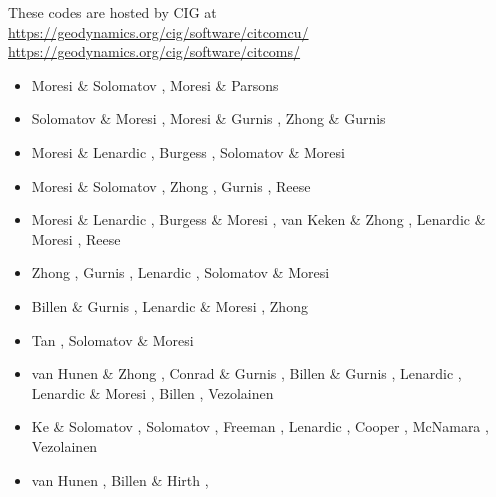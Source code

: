 \begin{itemize}
These codes are hosted by CIG at\\
\url{https://geodynamics.org/cig/software/citcomcu/}  \\
\url{https://geodynamics.org/cig/software/citcoms/}

\begin{scriptsize}
\begin{itemize}
\item[\nineteenninetyfive] Moresi \& Solomatov \cite{moso95}, Moresi \& Parsons \cite{mopa95}
\item[\nineteenninetysix] Solomatov \& Moresi \cite{somo96}, Moresi \& Gurnis \cite{mogu96}, 
                    Zhong \& Gurnis \cite{zhgu96}
\item[\nineteenninetyseven] Moresi \& Lenardic \cite{mole97}, Burgess \etal \cite{bugm97}, 
                    Solomatov \& Moresi \cite{somo97}
\item[\nineteenninetyeight] Moresi \& Solomatov \cite{moso98}, Zhong \etal \cite{zhgm98}, 
                    Gurnis \etal \cite{gumm98}, Reese \etal \cite{resm98}
\item[\nineteenninetynine] Moresi \& Lenardic \cite{mole99}, Burgess \& Moresi \cite{bumo99}, 
                    van Keken \& Zhong \cite{vazh99}, Lenardic \& Moresi \cite{lemo99}, 
                    Reese \etal \cite{resm99}
\item[\twothousand] Zhong \etal \cite{zhzm00}, Gurnis \etal \cite{gumr00,gumm00},
                    Lenardic \etal \cite{lemm00}, Solomatov \& Moresi \cite{somo00}
\item[\twothousandone] Billen \& Gurnis \cite{bigu01}, Lenardic \& Moresi \cite{lemo01},
                    Zhong \cite{zhon01}
\item[\twothousandtwo] Tan \etal \cite{tagh02}, Solomatov \& Moresi \cite{somo02}
\item[\twothousandthree] van Hunen \& Zhong \cite{vazh03}, Conrad \& Gurnis \cite{cogu03},
                    Billen \& Gurnis \cite{bigu03}, Lenardic \etal \cite{lemm03},
                    Lenardic \& Moresi \cite{lemo03}, Billen \etal \cite{bigs03}, 
                    Vezolainen \etal \cite{vesh03}
\item[\twothousandfour] Ke \& Solomatov \cite{keso04}, Solomatov \cite{solo04},
                    Freeman \etal \cite{frmm04}, Lenardic \etal \cite{lenm04},
                    Cooper \etal \cite{colm04}, McNamara \etal \cite{mczh04}, 
                    Vezolainen \etal \cite{vesb04}
\item[\twothousandfive] van Hunen \etal \cite{vazs05}, Billen \& Hirth \cite{bihi05},

\end{itemize}
\end{scriptsize}
\end{itemize}

